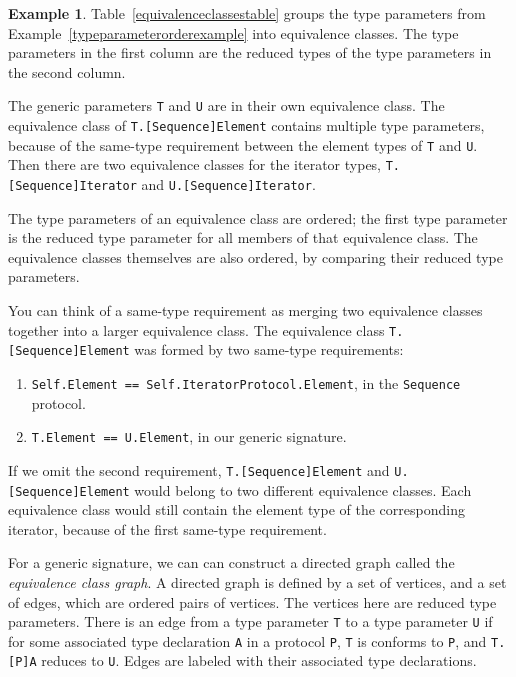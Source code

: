 \documentclass[a4paper,headsepline,bibliography=totoc,toc=flat,fleqn,twoside=semi]{scrbook}
\theoremstyle{definition}
\theoremstyle{definition}
\newtheorem{example}{Example}[chapter]
\theoremstyle{definition}
\begin{document}
\begin{example}
Table~\ref{equivalenceclassestable} groups the type parameters from Example~\ref{typeparameterorderexample} into equivalence classes. The type parameters in the first column are the reduced types of the type parameters in the second column.

The generic parameters \texttt{T} and \texttt{U} are in their own equivalence class. The equivalence class of \texttt{T.[Sequence]Element} contains multiple type parameters, because of the same-type requirement between the element types of \texttt{T} and \texttt{U}. Then there are two equivalence classes for the iterator types, \texttt{T.[Sequence]Iterator} and \texttt{U.[Sequence]Iterator}.

The type parameters of an equivalence class are ordered; the first type parameter is the reduced type parameter for all members of that equivalence class. The equivalence classes themselves are also ordered, by comparing their reduced type parameters.

You can think of a same-type requirement as merging two equivalence classes together into a larger equivalence class. The equivalence class \texttt{T.[Sequence]Element} was formed by two same-type requirements:
\begin{enumerate}
\item \texttt{Self.Element == Self.IteratorProtocol.Element}, in the \texttt{Sequence} protocol.
\item \texttt{T.Element == U.Element}, in our generic signature.
\end{enumerate}
If we omit the second requirement, \texttt{T.[Sequence]Element} and \texttt{U.[Sequence]Element} would belong to two different equivalence classes. Each equivalence class would still contain the element type of the corresponding iterator, because of the first same-type requirement.
\end{example}

For a generic signature, we can can construct a directed graph called the \emph{equivalence class graph}. A directed graph is defined by a set of vertices, and a set of edges, which are ordered pairs of vertices. The vertices here are reduced type parameters. There is an edge from a type parameter \texttt{T} to a type parameter \texttt{U} if for some associated type declaration \texttt{A} in a protocol \texttt{P}, \texttt{T} is conforms to \texttt{P}, and \texttt{T.[P]A} reduces to \texttt{U}. Edges are labeled with their associated type declarations.
\end{document}
